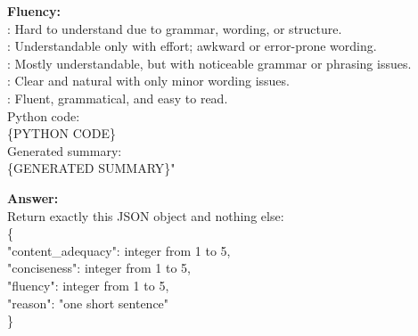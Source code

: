 \begin{center}
\begin{tcolorbox}[
    breakable,
    colback=white,
    colframe=black,
    title=LLM-as-a-Judge Prompt Structure,
    fonttitle=\bfseries
]
\quad \textbf{Fluency:}\\
: Hard to understand due to grammar, wording, or structure.\\
: Understandable only with effort; awkward or error-prone wording.\\
: Mostly understandable, but with noticeable grammar or phrasing issues.\\
: Clear and natural with only minor wording issues.\\
: Fluent, grammatical, and easy to read.\\[1mm]


\quad Python code:\\
\quad \{PYTHON CODE\}\\[1mm]

\quad Generated summary:\\
\quad \{GENERATED SUMMARY\}"\\[1mm]

\hfill{}

\textbf{Answer:} \\
\quad Return exactly this JSON object and nothing else:\\[1mm]
\quad \{\\[1mm]
\quad \quad "content\_adequacy": integer from 1 to 5,\\[1mm]
\quad \quad "conciseness": integer from 1 to 5,\\[1mm]
\quad \quad "fluency": integer from 1 to 5,\\[1mm]
\quad \quad "reason": "one short sentence"\\[1mm]
\quad \}\\[1mm]

\hfill{}
\end{tcolorbox}
\label{fig:llm_judge_prompt_full}
\end{center}

